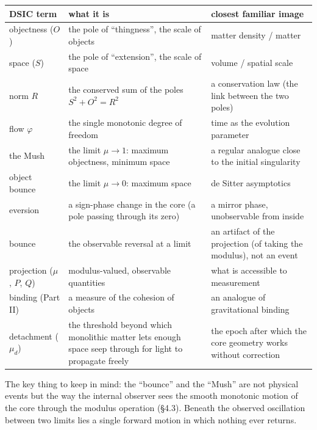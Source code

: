 \documentclass{article}
\begin{document}
\begin{table}[htbp]
\centering
\small
\begin{tabular}{@{}p{2.4cm}p{3.2cm}p{3.2cm}@{}}
\toprule
\textbf{DSIC term} & \textbf{what it is} & \textbf{closest familiar image} \\
\midrule
objectness ($O$) & the pole of ``thingness'', the scale of objects & matter density / matter \\
\addlinespace
space ($S$) & the pole of ``extension'', the scale of space & volume / spatial scale \\
\addlinespace
norm $R$ & the conserved sum of the poles $S^2 + O^2 = R^2$ & a conservation law (the link between the two poles) \\
\addlinespace
flow $\varphi$ & the single monotonic degree of freedom & time as the evolution parameter \\
\addlinespace
the Mush & the limit $\mu \to 1$: maximum objectness, minimum space & a regular analogue close to the initial singularity \\
\addlinespace
object bounce & the limit $\mu \to 0$: maximum space & de Sitter asymptotics \\
\addlinespace
eversion & a sign-phase change in the core (a pole passing through its zero) & a mirror phase, unobservable from inside \\
\addlinespace
bounce & the observable reversal at a limit & an artifact of the projection (of taking the modulus), not an event \\
\addlinespace
projection ($\mu$, $P$, $Q$) & modulus-valued, observable quantities & what is accessible to measurement \\
\addlinespace
binding (Part II) & a measure of the cohesion of objects & an analogue of gravitational binding \\
\addlinespace
detachment ($\mu_d$) & the threshold beyond which monolithic matter lets enough space seep through for light to propagate freely & the epoch after which the core geometry works without correction \\
\bottomrule
\end{tabular}
\end{table}

The key thing to keep in mind: the ``bounce'' and the ``Mush'' are not physical events but the way the internal observer sees the smooth monotonic motion of the core through the modulus operation (\S4.3). Beneath the observed oscillation between two limits lies a single forward motion in which nothing ever returns.
\end{document}
